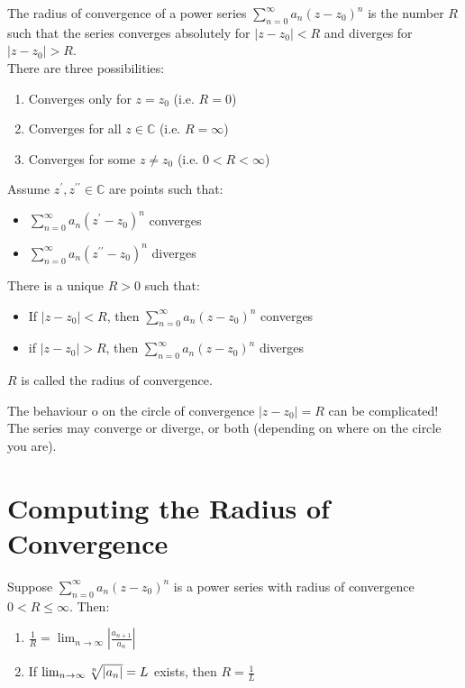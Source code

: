 \begin{definition}
    The radius of convergence of a power series $\sum_{n=0}^{\infty} a_n (z-z_0)^n$ is the number $R$ such that the series converges absolutely for $|z-z_0| < R$ and diverges for $|z-z_0| > R$. \\
    There are three possibilities:
    \begin{enumerate}
        \item Converges only for $z = z_0$ (i.e. $R = 0$)
        \item Converges for all $z \in \mathbb{C}$ (i.e. $R = \infty$)
        \item Converges for some $z \neq z_0$ (i.e. $0 < R < \infty$)
    \end{enumerate}
\end{definition}

\begin{lemma}
    Assume $z^\prime, z^{\prime\prime} \in \mathbb{C}$ are points such that:
    \begin{itemize}
        \item $\sum_{n=0}^{\infty} a_n (z^\prime - z_0)^n$ converges
        \item $\sum_{n=0}^{\infty} a_n (z^{\prime\prime} - z_0)^n$ diverges
    \end{itemize}

    There is a unique $R > 0$ such that:
    \begin{itemize}
        \item If $|z - z_0| < R$, then $\sum_{n=0}^{\infty} a_n (z - z_0)^n$ converges
        \item if $|z - z_0| > R$, then $\sum_{n=0}^{\infty} a_n (z - z_0)^n$ diverges
    \end{itemize}
    $R$ is called the radius of convergence.
\end{lemma}

\begin{remark}
    The behaviour o on the circle of convergence $|z - z_0| = R$ can be complicated! The series may converge or diverge, or both (depending on where on the circle you are).
\end{remark}

\section{Computing the Radius of Convergence}

\begin{theorem}
    Suppose $\sum_{n=0}^{\infty} a_n (z - z_0)^n$ is a power series with radius of convergence $ 0 < R \leq \infty$. Then:
    \begin{enumerate}
        \item $\frac{1}{R} = \lim_{n \to \infty}\left| \frac{a_{n+1}}{a_n} \right|$
        \item If $\lim_{n \to \infty} \root{n}\of{|a_n|}  = L$ exists, then $R = \frac{1}{L}$
    \end{enumerate}
\end{theorem}


